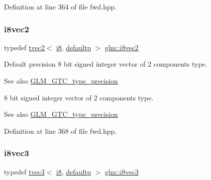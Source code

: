 Definition at line 364 of file fwd.\+hpp.

\mbox{\label{group__gtc__type__precision_ga277312370b6155b37dbf2a6954c42915}} 
\subsubsection{\texorpdfstring{i8vec2}{i8vec2}}
{\footnotesize\ttfamily typedef \mbox{\hyperlink{structglm_1_1tvec2}{tvec2}}$<$ \mbox{\hyperlink{group__gtc__type__precision_gaae064be68b7d36cd7910c16e8ad18bba}{i8}}, \mbox{\hyperlink{namespaceglm_a0f04f086094c747d227af4425893f545a9d21ccd8b5a009ec7eb7677befc3bf51}{defaultp}} $>$ \mbox{\hyperlink{group__gtc__type__precision_ga277312370b6155b37dbf2a6954c42915}{glm\+::i8vec2}}}

Default precision 8 bit signed integer vector of 2 components type. \begin{DoxySeeAlso}{See also}
\mbox{\hyperlink{group__gtc__type__precision}{G\+L\+M\+\_\+\+G\+T\+C\+\_\+type\+\_\+precision}}
\end{DoxySeeAlso}
8 bit signed integer vector of 2 components type. \begin{DoxySeeAlso}{See also}
\mbox{\hyperlink{group__gtc__type__precision}{G\+L\+M\+\_\+\+G\+T\+C\+\_\+type\+\_\+precision}} 
\end{DoxySeeAlso}


Definition at line 368 of file fwd.\+hpp.

\mbox{\label{group__gtc__type__precision_ga97a6cae79db311cdd47c4e88a5855987}} 
\subsubsection{\texorpdfstring{i8vec3}{i8vec3}}
{\footnotesize\ttfamily typedef \mbox{\hyperlink{structglm_1_1tvec3}{tvec3}}$<$ \mbox{\hyperlink{group__gtc__type__precision_gaae064be68b7d36cd7910c16e8ad18bba}{i8}}, \mbox{\hyperlink{namespaceglm_a0f04f086094c747d227af4425893f545a9d21ccd8b5a009ec7eb7677befc3bf51}{defaultp}} $>$ \mbox{\hyperlink{group__gtc__type__precision_ga97a6cae79db311cdd47c4e88a5855987}{glm\+::i8vec3}}}

